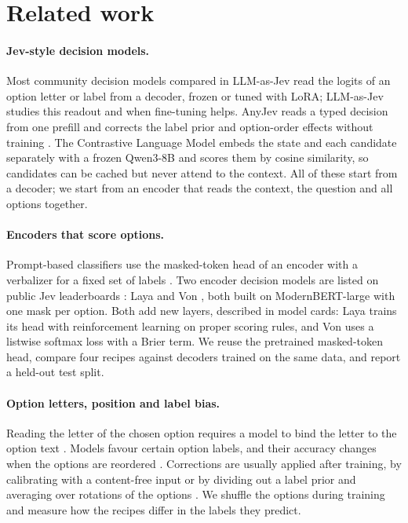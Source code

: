 \section{Related work}
\label{sec:related}

\paragraph{Jev-style decision models.}
Most community decision models compared in LLM-as-Jev \citep{li2026llmasjev} read the logits of an option letter or label from a decoder, frozen or tuned with LoRA; LLM-as-Jev studies this readout and when fine-tuning helps.
AnyJev reads a typed decision from one prefill and corrects the label prior and option-order effects without training \citep{zhang2026anyjev}.
The Contrastive Language Model \citep{kwok2026clm} embeds the state and each candidate separately with a frozen Qwen3-8B and scores them by cosine similarity, so candidates can be cached but never attend to the context.
All of these start from a decoder; we start from an encoder that reads the context, the question and all options together.

\paragraph{Encoders that score options.}
Prompt-based classifiers use the masked-token head of an encoder with a verbalizer for a fixed set of labels \citep{schick2021pet, gao2021lmbff}.
Two encoder decision models are listed on public Jev leaderboards \citep{jevbench}: Laya \citep{laya} and Von \citep{von}, both built on ModernBERT-large with one mask per option.
Both add new layers, described in model cards: Laya trains its head with reinforcement learning on proper scoring rules, and Von uses a listwise softmax loss with a Brier term.
We reuse the pretrained masked-token head, compare four recipes against decoders trained on the same data, and report a held-out test split.

\paragraph{Option letters, position and label bias.}
Reading the letter of the chosen option requires a model to bind the letter to the option text \citep{robinson2023mcsb}.
Models favour certain option labels, and their accuracy changes when the options are reordered \citep{zheng2024notrobust, pezeshkpour2024order}.
Corrections are usually applied after training, by calibrating with a content-free input \citep{zhao2021calibrate} or by dividing out a label prior and averaging over rotations of the options \citep{zhang2026anyjev}.
We shuffle the options during training and measure how the recipes differ in the labels they predict.


